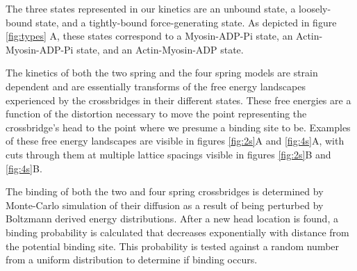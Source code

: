 \documentclass[]{article}
\begin{document}
The three states represented in our kinetics are an unbound state, a loosely-bound state, and a tightly-bound force-generating state.
As depicted in figure \ref{fig:types} A, these states correspond to a Myosin-ADP-Pi state, an Actin-Myosin-ADP-Pi state, and an Actin-Myosin-ADP state.

The kinetics of both the two spring and the four spring models are strain dependent and are essentially transforms of the free energy landscapes experienced by the crossbridges in their different states.
These free energies are a function of the distortion necessary to move the point representing the crossbridge's head to the point where we presume a binding site to be.
Examples of these free energy landscapes are visible in figures \ref{fig:2s}A and \ref{fig:4s}A, with cuts through them at multiple lattice spacings visible in figures \ref{fig:2s}B and \ref{fig:4s}B.

The binding of both the two and four spring crossbridges is determined by Monte-Carlo simulation of their diffusion as a result of being perturbed by Boltzmann derived energy distributions. 
After a new head location is found, a binding probability is calculated that decreases exponentially with distance from the potential binding site. 
This probability is tested against a random number from a uniform distribution to determine if binding occurs.
\end{document}
